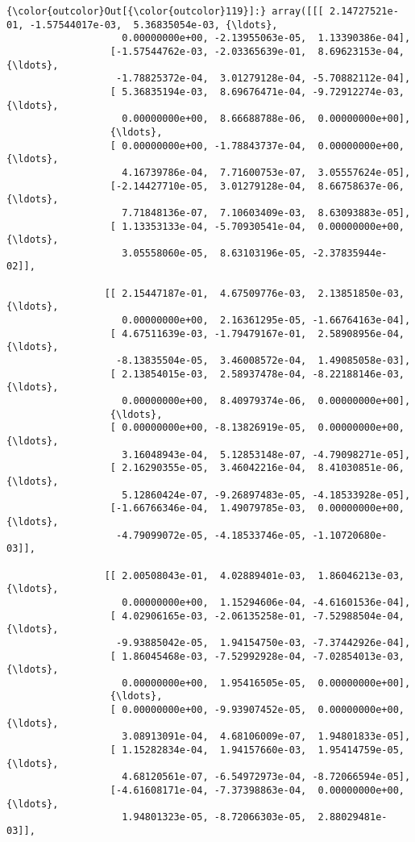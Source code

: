 \documentclass[11pt]{article}
\begin{document}
\begin{Verbatim}[commandchars=\\\{\}]
{\color{outcolor}Out[{\color{outcolor}119}]:} array([[[ 2.14727521e-01, -1.57544017e-03,  5.36835054e-03, {\ldots},
                    0.00000000e+00, -2.13955063e-05,  1.13390386e-04],
                  [-1.57544762e-03, -2.03365639e-01,  8.69623153e-04, {\ldots},
                   -1.78825372e-04,  3.01279128e-04, -5.70882112e-04],
                  [ 5.36835194e-03,  8.69676471e-04, -9.72912274e-03, {\ldots},
                    0.00000000e+00,  8.66688788e-06,  0.00000000e+00],
                  {\ldots},
                  [ 0.00000000e+00, -1.78843737e-04,  0.00000000e+00, {\ldots},
                    4.16739786e-04,  7.71600753e-07,  3.05557624e-05],
                  [-2.14427710e-05,  3.01279128e-04,  8.66758637e-06, {\ldots},
                    7.71848136e-07,  7.10603409e-03,  8.63093883e-05],
                  [ 1.13353133e-04, -5.70930541e-04,  0.00000000e+00, {\ldots},
                    3.05558060e-05,  8.63103196e-05, -2.37835944e-02]],
          
                 [[ 2.15447187e-01,  4.67509776e-03,  2.13851850e-03, {\ldots},
                    0.00000000e+00,  2.16361295e-05, -1.66764163e-04],
                  [ 4.67511639e-03, -1.79479167e-01,  2.58908956e-04, {\ldots},
                   -8.13835504e-05,  3.46008572e-04,  1.49085058e-03],
                  [ 2.13854015e-03,  2.58937478e-04, -8.22188146e-03, {\ldots},
                    0.00000000e+00,  8.40979374e-06,  0.00000000e+00],
                  {\ldots},
                  [ 0.00000000e+00, -8.13826919e-05,  0.00000000e+00, {\ldots},
                    3.16048943e-04,  5.12853148e-07, -4.79098271e-05],
                  [ 2.16290355e-05,  3.46042216e-04,  8.41030851e-06, {\ldots},
                    5.12860424e-07, -9.26897483e-05, -4.18533928e-05],
                  [-1.66766346e-04,  1.49079785e-03,  0.00000000e+00, {\ldots},
                   -4.79099072e-05, -4.18533746e-05, -1.10720680e-03]],
          
                 [[ 2.00508043e-01,  4.02889401e-03,  1.86046213e-03, {\ldots},
                    0.00000000e+00,  1.15294606e-04, -4.61601536e-04],
                  [ 4.02906165e-03, -2.06135258e-01, -7.52988504e-04, {\ldots},
                   -9.93885042e-05,  1.94154750e-03, -7.37442926e-04],
                  [ 1.86045468e-03, -7.52992928e-04, -7.02854013e-03, {\ldots},
                    0.00000000e+00,  1.95416505e-05,  0.00000000e+00],
                  {\ldots},
                  [ 0.00000000e+00, -9.93907452e-05,  0.00000000e+00, {\ldots},
                    3.08913091e-04,  4.68106009e-07,  1.94801833e-05],
                  [ 1.15282834e-04,  1.94157660e-03,  1.95414759e-05, {\ldots},
                    4.68120561e-07, -6.54972973e-04, -8.72066594e-05],
                  [-4.61608171e-04, -7.37398863e-04,  0.00000000e+00, {\ldots},
                    1.94801323e-05, -8.72066303e-05,  2.88029481e-03]],
          

\end{Verbatim}
\end{document}
